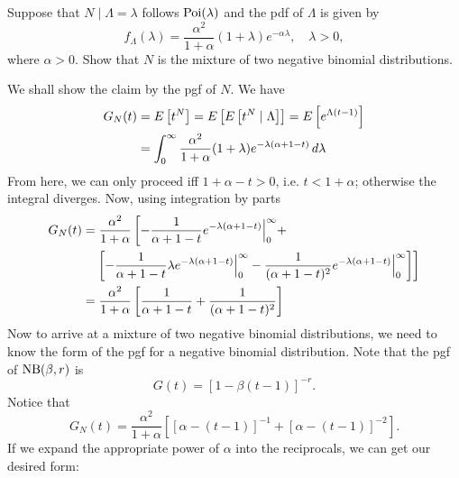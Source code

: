 \documentclass[notoc,notitlepage]{tufte-book}
\begin{document}
\begin{eg}
  Suppose that $N \mid \Lambda = \lambda$ follows $\operatorname{Poi}(\lambda)$ and the pdf of $\Lambda$ is given by
  \begin{equation*}
    f_\Lambda(\lambda) = \frac{\alpha^2}{1 + \alpha}( 1 + \lambda ) e^{-\alpha\lambda}, \quad \lambda > 0,
  \end{equation*}
  where $\alpha > 0$. Show that $N$ is the mixture of two negative binomial distributions.
\end{eg}

\begin{solution}
  We shall show the claim by the pgf of $N$. We have
  \begin{align*}
    G_N(t) &= E \left[ t^N \right] = E \left[ E \left[ t^N \mid \Lambda \right] \right] = E \left[ e^{\Lambda ( t - 1 )} \right] \\
           &= \int_{0}^{\infty} \frac{\alpha^2}{1 + \alpha} ( 1 + \lambda ) e^{-\lambda( \alpha + 1 - t )} \mathop{}\!d{\lambda}
  \end{align*}
  From here, we can only proceed iff $1 + \alpha - t > 0$, i.e. $t < 1 + \alpha$; otherwise the integral diverges. Now, using integration by parts
  \begin{align*}
    G_N(t) &= \frac{\alpha^2}{1 + \alpha} \left[ - \frac{1}{\alpha + 1 - t} e^{-\lambda (\alpha + 1 - t)} \Big|_{0}^{\infty} + \right. \\
           &\quad \left. \left[ - \frac{1}{\alpha + 1 - t} \lambda e^{-\lambda(\alpha + 1 - t)} \Big|_{0}^{\infty} - \frac{1}{(\alpha + 1 - t)^2} e^{-\lambda(\alpha + 1 - t)} \Big|_{0}^{\infty} \right] \right] \\
           &= \frac{\alpha^2}{1 + \alpha} \left[ \frac{1}{\alpha + 1 - t} + \frac{1}{( \alpha + 1 - t )^2} \right]
  \end{align*}
  Now to arrive at a mixture of two negative binomial distributions, we need to know the form of the pgf for a negative binomial distribution. Note that the pgf of $\operatorname{NB}(\beta, r)$ is
  \begin{equation*}
    G(t) = \left[ 1 - \beta( t - 1 ) \right]^{-r}.
  \end{equation*}
  Notice that
  \begin{equation*}
    G_N(t) = \frac{\alpha^2}{1 + \alpha} \left[ [ \alpha - ( t - 1 ) ]^{-1} + [ \alpha - ( t - 1 ) ]^{-2} \right].
  \end{equation*}
  If we expand the appropriate power of $\alpha$ into the reciprocals, we can get our desired form:
  \begin{equation*}

\end{equation*}
\end{solution}
\end{document}
